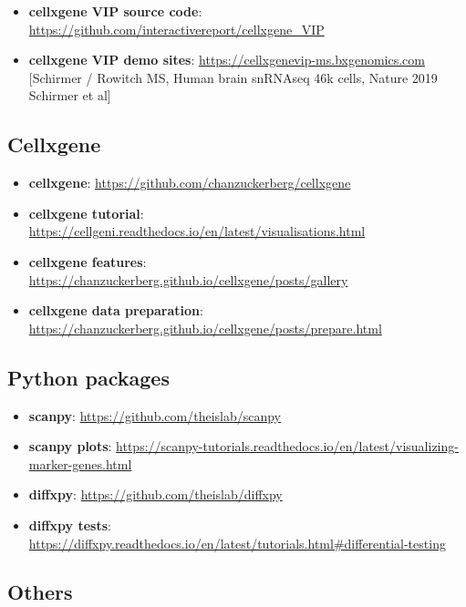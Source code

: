 \documentclass[
]{article}
\providecommand{\tightlist}{%
  \setlength{\itemsep}{0pt}\setlength{\parskip}{0pt}}
\begin{document}
\begin{itemize}
\tightlist
\item
  \textbf{cellxgene VIP source code}: \url{https://github.com/interactivereport/cellxgene_VIP}
\item
  \textbf{cellxgene VIP demo sites}: \url{https://cellxgenevip-ms.bxgenomics.com} {[}Schirmer / Rowitch MS, Human brain snRNAseq 46k cells, Nature 2019 Schirmer et al{]}
\end{itemize}

\hypertarget{cellxgene}{%
\subsection*{Cellxgene}\label{cellxgene}}

\begin{itemize}
\tightlist
\item
  \textbf{cellxgene}: \url{https://github.com/chanzuckerberg/cellxgene}
\item
  \textbf{cellxgene tutorial}: \url{https://cellgeni.readthedocs.io/en/latest/visualisations.html}
\item
  \textbf{cellxgene features}: \url{https://chanzuckerberg.github.io/cellxgene/posts/gallery}
\item
  \textbf{cellxgene data preparation}: \url{https://chanzuckerberg.github.io/cellxgene/posts/prepare.html}
\end{itemize}

\hypertarget{python-packages}{%
\subsection*{Python packages}\label{python-packages}}

\begin{itemize}
\tightlist
\item
  \textbf{scanpy}: \url{https://github.com/theislab/scanpy}
\item
  \textbf{scanpy plots}: \url{https://scanpy-tutorials.readthedocs.io/en/latest/visualizing-marker-genes.html}
\item
  \textbf{diffxpy}: \url{https://github.com/theislab/diffxpy}
\item
  \textbf{diffxpy tests}: \url{https://diffxpy.readthedocs.io/en/latest/tutorials.html\#differential-testing}
\end{itemize}

\hypertarget{others}{%
\subsection*{Others}\label{others}}
\end{document}
